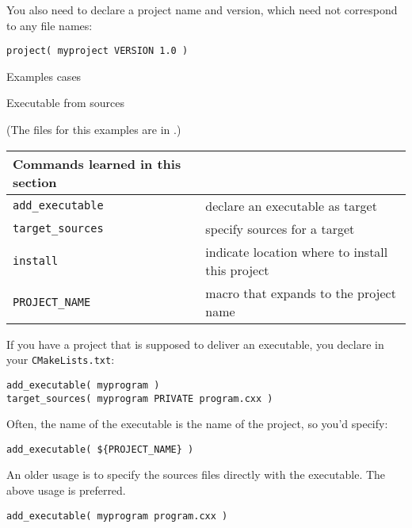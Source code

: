 You also need to declare a project name and version,
which need not correspond to any file names:
\begin{lstlisting}
project( myproject VERSION 1.0 )
\end{lstlisting}

\newpage
{} {Examples cases}

 {Executable from sources}

(The files for this examples are in .)

\begin{tabular}{lp{3in}}
  \toprule
  Commands learned in this section\\
  \midrule
  \lstinline+add_executable+&declare an executable as target\\
  \lstinline+target_sources+&specify sources for a target\\
  \lstinline+install+&indicate location where to install this project\\
  \lstinline+PROJECT_NAME+&macro that expands to the project name \\
  \bottomrule
\end{tabular}

\begin{floatingfigure}[r]{2.5in}
  \begin{minipage}{2.5in}
  \end{minipage}
\end{floatingfigure}
%
If you have a project that is supposed to deliver an executable,
you declare in your \texttt{CMakeLists.txt}:
\begin{lstlisting}
add_executable( myprogram )
target_sources( myprogram PRIVATE program.cxx )
\end{lstlisting}
Often, the name of the executable is the name of the project,
so you'd specify:
\begin{lstlisting}
add_executable( ${PROJECT_NAME} )
\end{lstlisting}
%
\begin{remark}
  An older usage is to specify the sources files directly
  with the executable. The above usage is preferred.
\begin{lstlisting}
add_executable( myprogram program.cxx )
\end{lstlisting}  
\end{remark}

